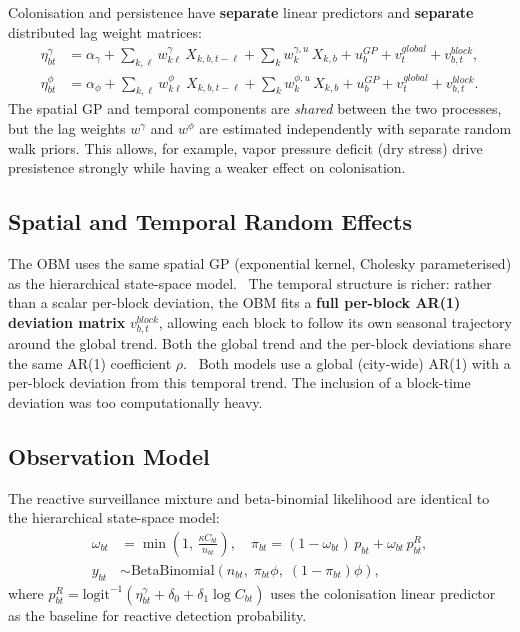 \documentclass[12pt,a4paper]{article}
\begin{document}
Colonisation and persistence have \textbf{separate} linear predictors and \textbf{separate} distributed lag weight matrices:
\begin{align}
\eta_{bt}^\gamma &= \alpha_\gamma + \sum_{k,\ell} w_{k\ell}^\gamma\, X_{k,b,t-\ell} + \sum_k w_k^{\gamma,u}\, X_{k,b} + u_b^{GP} + v_t^{global} + v_{b,t}^{block}, \\
\eta_{bt}^\phi   &= \alpha_\phi   + \sum_{k,\ell} w_{k\ell}^\phi\,   X_{k,b,t-\ell} + \sum_k w_k^{\phi,u}\,   X_{k,b} + u_b^{GP} + v_t^{global} + v_{b,t}^{block}.
\end{align}
The spatial GP and temporal components are \emph{shared} between the two processes, but the lag weights $w^\gamma$ and $w^\phi$ are estimated independently with separate random walk priors. This allows, for example, vapor pressure deficit (dry stress) drive presistence strongly while having a weaker effect on colonisation.

\subsection{Spatial and Temporal Random Effects}

The OBM uses the same spatial GP (exponential kernel, Cholesky parameterised) as the hierarchical state-space model. ~The temporal structure is richer: rather than a scalar per-block deviation, the OBM fits a \textbf{full per-block AR(1) deviation matrix} $v_{b,t}^{block}$, allowing each block to follow its own seasonal trajectory around the global trend. Both the global trend and the per-block deviations share the same AR(1) coefficient $\rho$.~ Both models use a global (city-wide) AR(1) with a per-block deviation from this temporal trend. The inclusion of a block-time deviation was too computationally heavy. 

\subsection{Observation Model}

The reactive surveillance mixture and beta-binomial likelihood are identical to the hierarchical state-space model:
\begin{align}
\omega_{bt} &= \min\!\left(1,\, \frac{\kappa C_{bt}}{n_{bt}}\right), \quad
\pi_{bt}     = (1-\omega_{bt})\, p_{bt} + \omega_{bt}\, p_{bt}^R, \\
y_{bt}       &\sim \text{BetaBinomial}(n_{bt},\; \pi_{bt}\phi,\; (1-\pi_{bt})\phi),
\end{align}
where $p_{bt}^R = \text{logit}^{-1}(\eta_{bt}^\gamma + \delta_0 + \delta_1 \log C_{bt})$ uses the colonisation linear predictor as the baseline for reactive detection probability.
\end{document}
